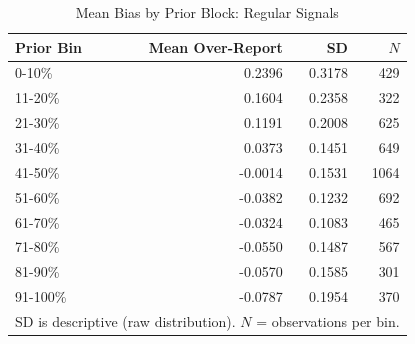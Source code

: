 \begin{table}[htbp]
\centering
\caption{Mean Bias by Prior Block: Regular Signals}
\label{tab:reg_bias_prior}
\begin{tabular}{lrrr}
\hline
Prior Bin & Mean Over-Report & SD & $N$ \\
\hline
0-10\% & 0.2396 & 0.3178 & 429 \\
11-20\% & 0.1604 & 0.2358 & 322 \\
21-30\% & 0.1191 & 0.2008 & 625 \\
31-40\% & 0.0373 & 0.1451 & 649 \\
41-50\% & -0.0014 & 0.1531 & 1064 \\
51-60\% & -0.0382 & 0.1232 & 692 \\
61-70\% & -0.0324 & 0.1083 & 465 \\
71-80\% & -0.0550 & 0.1487 & 567 \\
81-90\% & -0.0570 & 0.1585 & 301 \\
91-100\% & -0.0787 & 0.1954 & 370 \\
\hline
\multicolumn{4}{l}{\small SD is descriptive (raw distribution). $N$ = observations per bin.} \\
\end{tabular}
\end{table}
